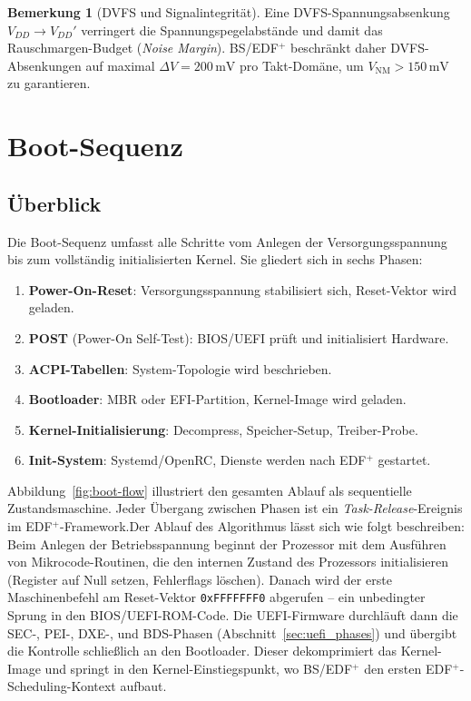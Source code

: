 ﻿\documentclass[a4paper,12pt]{scrreprt}
\theoremstyle{definition}
\newtheorem{bemerkung}{Bemerkung}[chapter]
\begin{document}
	\begin{bemerkung}[DVFS und Signalintegrität]
		Eine DVFS-Spannungsabsenkung $V_{DD} \to V_{DD}'$ verringert die
		Spannungspegelabstände und damit das Rauschmargen-Budget (\emph{Noise Margin}).
		BS/EDF$^+$ beschränkt daher DVFS-Absenkungen auf maximal $\Delta V = 200\,\text{mV}$
		pro Takt-Domäne, um $V_{\mathrm{NM}} > 150\,\text{mV}$ zu garantieren.
	\end{bemerkung}
	
	\chapter{Boot-Sequenz}
	
	\section{Überblick}

	Die Boot-Sequenz umfasst alle Schritte vom Anlegen der Versorgungsspannung
	bis zum vollständig initialisierten Kernel. Sie gliedert sich in sechs Phasen:

	\begin{enumerate}
		\item \textbf{Power-On-Reset}: Versorgungsspannung stabilisiert sich,
		Reset-Vektor wird geladen.
		\item \textbf{POST} (Power-On Self-Test): BIOS/UEFI prüft und initialisiert
		Hardware.
		\item \textbf{ACPI-Tabellen}: System-Topologie wird beschrieben.
		\item \textbf{Bootloader}: MBR oder EFI-Partition, Kernel-Image wird geladen.
		\item \textbf{Kernel-Initialisierung}: Decompress, Speicher-Setup,
		Treiber-Probe.
		\item \textbf{Init-System}: Systemd/OpenRC, Dienste werden nach EDF$^+$
		gestartet.
	\end{enumerate}

	Abbildung~\ref{fig:boot-flow} illustriert den gesamten Ablauf als
	sequentielle Zustandsmaschine. Jeder Übergang zwischen Phasen ist ein
	\emph{Task-Release}-Ereignis im EDF$^+$-Framework.Der Ablauf des Algorithmus lässt sich wie folgt beschreiben: 
	Beim Anlegen der Betriebsspannung beginnt der Prozessor mit dem Ausführen von
	Mikrocode-Routinen, die den internen Zustand des Prozessors initialisieren
	(Register auf Null setzen, Fehlerflags löschen). Danach wird der erste
	Maschinenbefehl am Reset-Vektor \texttt{0xFFFFFFF0} abgerufen -- ein
	unbedingter Sprung in den BIOS/UEFI-ROM-Code. Die UEFI-Firmware durchläuft
	dann die SEC-, PEI-, DXE-, und BDS-Phasen (Abschnitt~\ref{sec:uefi_phases})
	und übergibt die Kontrolle schließlich an den Bootloader. Dieser
	dekomprimiert das Kernel-Image und springt in den Kernel-Einstiegspunkt,
	wo BS/EDF$^+$ den ersten EDF$^+$-Scheduling-Kontext aufbaut.
\end{document}

